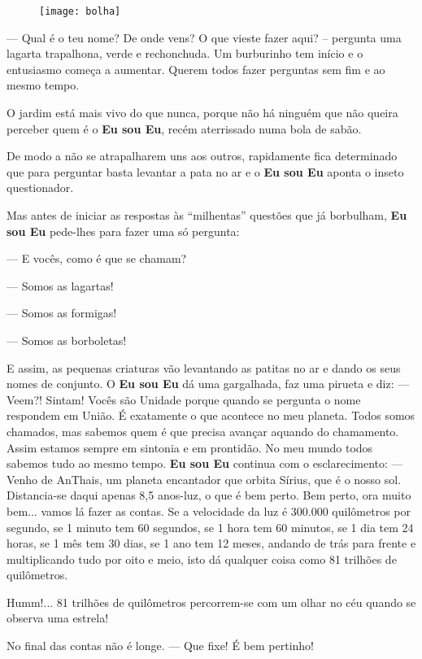 \begin{figure}[h]
    \centering
    \texttt{[image: bolha]}
\end{figure}

— Qual é o teu nome? De onde vens? O que vieste fazer aqui? – pergunta uma lagarta trapalhona, verde e rechonchuda.
\bigbreak
Um burburinho tem início e o entusiasmo começa a aumentar. Querem todos fazer perguntas sem fim e ao mesmo tempo.

O jardim está mais vivo do que nunca, porque não há ninguém que não queira perceber quem é o \textbf{Eu sou Eu}, recém aterrissado numa bola de sabão.

De modo a não se atrapalharem uns aos outros, rapidamente fica determinado que para perguntar basta levantar a pata no ar e o \textbf{Eu sou Eu} aponta o inseto questionador.

Mas antes de iniciar as respostas às “milhentas” questões que já borbulham, \textbf{Eu sou Eu} pede-lhes para fazer uma só pergunta:

— E vocês, como é que se chamam?

— Somos as lagartas!

— Somos as formigas!

— Somos as borboletas!

E assim, as pequenas criaturas vão levantando as patitas no ar e dando os seus nomes de conjunto.
\bigbreak
O \textbf{Eu sou Eu} dá uma gargalhada, faz uma pirueta e diz:
\bigbreak
— Veem?! Sintam! Vocês são Unidade porque quando se pergunta o nome respondem em União. É exatamente o que acontece no meu planeta. Todos somos chamados, mas sabemos quem é que precisa avançar aquando do chamamento. Assim estamos sempre em sintonia e em prontidão. No meu mundo todos sabemos tudo ao mesmo tempo.
\bigbreak
\textbf{Eu sou Eu} continua com o esclarecimento:
\bigbreak
— Venho de AnThais, um planeta encantador que orbita Sírius, que é o nosso sol. Distancia-se daqui apenas 8,5 anos-luz, o que é bem perto.
\bigbreak
Bem perto, ora muito bem... vamos lá fazer as contas.
Se a velocidade da luz é 300.000 quilômetros por segundo, se 1 minuto tem 60 segundos, se 1 hora tem 60 minutos, se 1 dia tem 24 horas, se 1 mês tem 30 dias, se 1 ano tem 12 meses, andando de trás para frente e multiplicando tudo por oito e meio, isto dá qualquer coisa como 81 trilhões de quilômetros.

Humm!... 81 trilhões de quilômetros percorrem-se com um olhar no céu quando se observa uma estrela!

No final das contas não é longe.
\bigbreak
— Que fixe! É bem pertinho!

